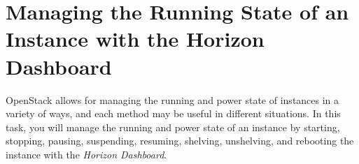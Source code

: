 \documentclass[letterpaper, 12pt]{article}
\begin{document}

\section{Managing the Running State of an Instance with the Horizon Dashboard}\label{sec:managing-the-running-state-of-an-instance-with-the-horizon-dashboard}
OpenStack allows for managing the running and power state of instances in a variety of ways, and each method may be useful in different situations.
In this task, you will manage the running and power state of an instance by starting, stopping, pausing, suspending, resuming, shelving, unshelving, and rebooting the instance with the \textit{Horizon Dashboard}.
\end{document}
